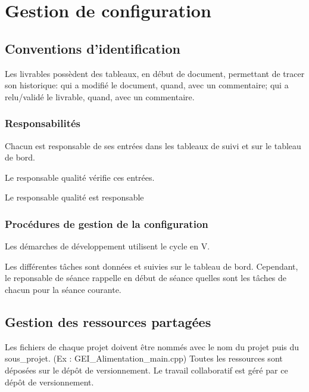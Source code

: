 \section{Gestion de configuration}

\subsection{Conventions d'identification}
Les livrables possèdent des tableaux, en début de document, permettant
de tracer son historique: qui a modifié le document, quand, avec un
commentaire; qui a relu/validé le livrable, quand, avec un commentaire.

\subsubsection{Responsabilités}

Chacun est responsable de ses entrées dans les tableaux de suivi et sur le 
tableau de bord.

Le responsable qualité vérifie ces entrées.

Le responsable qualité est responsable 

\subsubsection{Procédures de gestion de la configuration}

Les démarches de développement utilisent le cycle en V.

Les différentes tâches sont données et suivies sur le tableau de bord. Cependant, 
le reponsable de séance rappelle en début de séance quelles sont les tâches de 
chacun pour la séance courante.

\subsection{Gestion des ressources partagées}

Les fichiers de chaque projet doivent être nommés avec le nom du projet puis du 
sous\_projet. (Ex : GEI\_Alimentation\_main.cpp)
Toutes les ressources sont déposées sur le dépôt de versionnement. Le travail 
collaboratif est géré par ce dépôt de versionnement.

